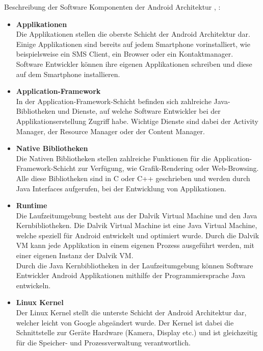 Beschreibung der Software Komponenten der Android Architektur \cite{overviewAndroid:singh}, \cite{androidTutorialOS}: 
\begin{itemize}
	\item \textbf{Applikationen}\\
	Die Applikationen stellen die oberste Schicht der Android Architektur dar. Einige Applikationen sind bereits auf jedem Smartphone vorinstalliert, wie beispielsweise ein SMS Client,  ein Browser oder ein Kontaktmanager. Software Entwickler können ihre eigenen Applikationen schreiben und diese auf dem Smartphone installieren.
	\item \textbf{Application-Framework}\\
    In der Application-Framework-Schicht befinden sich zahlreiche Java-Bibliotheken und Dienste, auf welche Software Entwickler bei der Applikationserstellung Zugriff habe. Wichtige Dienste sind dabei der Activity Manager, der Resource Manager oder der Content Manager.
	\item \textbf{Native Bibliotheken}\\
	Die Nativen Bibliotheken stellen zahlreiche Funktionen für die Application-Framework-Schicht zur Verfügung, wie Grafik-Rendering oder Web-Browsing. Alle diese Bibliotheken sind in C oder C++ geschrieben und werden durch Java Interfaces aufgerufen, bei der Entwicklung von Applikationen.
	\item \textbf{Runtime}\\
	Die Laufzeitumgebung besteht aus der Dalvik Virtual Machine und den Java Kernbibliotheken. Die Dalvik Virtual Machine ist eine Java Virtual Machine, welche speziell für Android entwickelt und optimiert wurde.  Durch die  Dalvik VM kann jede Applikation in einem eigenen Prozess ausgeführt werden, mit einer eigenen Instanz der Dalvik VM. \\
	Durch die Java Kernbibliotheken in der Laufzeitumgebung können Software Entwickler Android Applikationen mithilfe der Programmiersprache Java entwickeln.   
	\item \textbf{Linux Kernel}\\
	Der Linux Kernel stellt die unterste Schicht der Android Architektur dar, welcher leicht von Google abgeändert wurde. Der Kernel ist dabei die Schnittstelle zur Geräte Hardware (Kamera, Display etc.) und ist gleichzeitig für die Speicher- und Prozessverwaltung verantwortlich.
	
	
	
	
	
	
	
	
	
	
	
	
	
	
	
	
	
	
	
	
	
	
	
	
	
	
	
	
	
	
	
	
	
	
\end{itemize}